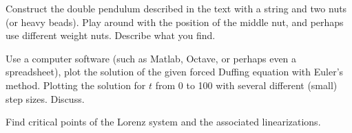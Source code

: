 \begin{exercise}[project]
Construct the double pendulum described in the text with a string and two
nuts (or heavy beads).  Play around with the position of the middle nut, and
perhaps use different weight nuts.  Describe what you find.
\end{exercise}

\begin{exercise}
Use a computer software (such as Matlab, Octave, or
perhaps even a spreadsheet), plot the solution
of the given forced Duffing equation with Euler's method.  Plotting the
solution for $t$ from 0 to 100 with several different (small) step sizes.
Discuss.
\end{exercise}

\setcounter{exercise}{100}

\begin{exercise}
Find critical points of the Lorenz system and the associated linearizations.
\end{exercise}
